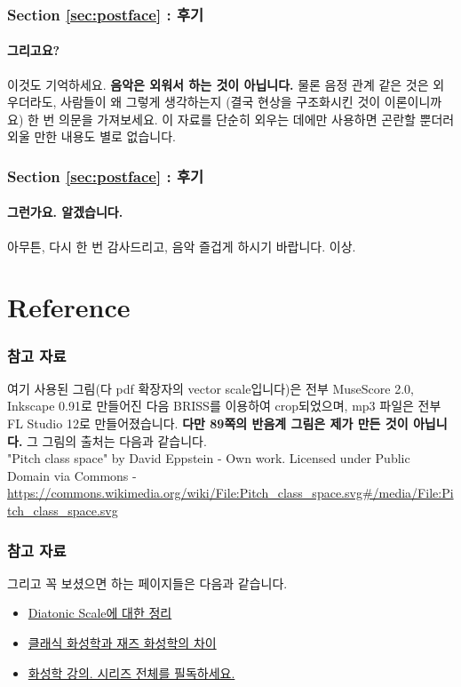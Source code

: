 \documentclass{beamer}
\begin{document}
	\begin{frame}
		\frametitle{Section \ref{sec:postface} : 후기}
		\framesubtitle{그리고요?}
		이것도 기억하세요. {\bf 음악은 외워서 하는 것이 아닙니다.} 물론 음정 관계 같은 것은 외우더라도, 사람들이 왜 그렇게 생각하는지 (결국 현상을 구조화시킨 것이 이론이니까요) 한 번 의문을 가져보세요. 이 자료를 단순히 외우는 데에만 사용하면 곤란할 뿐더러 외울 만한 내용도 별로 없습니다.
	\end{frame}
	
	\begin{frame}
		\frametitle{Section \ref{sec:postface} : 후기}
		\framesubtitle{그런가요. 알겠습니다.}
		아무튼, 다시 한 번 감사드리고, 음악 즐겁게 하시기 바랍니다. 이상.
	\end{frame}
	
	\section*{Reference}
	\begin{frame}
		\frametitle{참고 자료}
		여기 사용된 그림(다 pdf 확장자의 vector scale입니다)은 전부 MuseScore 2.0, Inkscape 0.91로 만들어진 다음 BRISS를 이용하여 crop되었으며, mp3 파일은 전부 FL Studio 12로 만들어졌습니다. {\bf 다만 89쪽의 반음계 그림은 제가 만든 것이 아닙니다.} 그 그림의 출처는 다음과 같습니다.\\
		"Pitch class space" by David Eppstein - Own work. Licensed under Public Domain via Commons - \url{https://commons.wikimedia.org/wiki/File:Pitch_class_space.svg\#/media/File:Pitch_class_space.svg} 
	\end{frame}
	
	\begin{frame}
		\frametitle{참고 자료}
		그리고 꼭 보셨으면 하는 페이지들은 다음과 같습니다.
		\begin{itemize}
			\color{cyan}
			\item \href{http://flstudio.co.kr/xe/index.php?document_srl=350369&mid=old_user_guide}{Diatonic Scale에 대한 정리}
			\item \href{http://bonik.me/416}{클래식 화성학과 재즈 화성학의 차이}
			\item \href{http://fevernigga.tistory.com/6}{화성학 강의. 시리즈 전체를 필독하세요.}
		\end{itemize}
	\end{frame}
	
\end{document}

